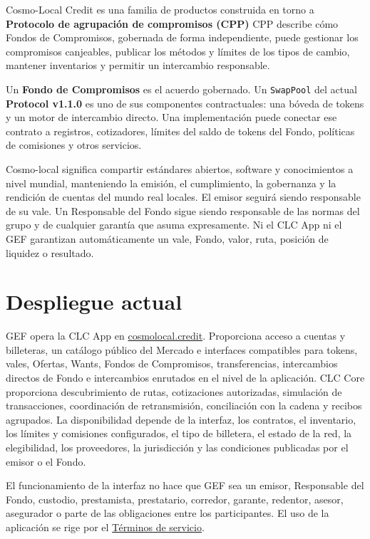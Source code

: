 \documentclass[11pt]{article}
\begin{document}
Cosmo-Local Credit es una familia de productos construida en torno a \textbf{Protocolo de agrupación de compromisos (CPP)} CPP describe cómo Fondos de Compromisos, gobernada de forma independiente, puede gestionar los compromisos canjeables, publicar los métodos y límites de los tipos de cambio, mantener inventarios y permitir un intercambio responsable.

Un \textbf{Fondo de Compromisos} es el acuerdo gobernado. Un \texttt{SwapPool} del actual \textbf{Protocol v1.1.0} es uno de sus componentes contractuales: una bóveda de tokens y un motor de intercambio directo. Una implementación puede conectar ese contrato a registros, cotizadores, límites del saldo de tokens del Fondo, políticas de comisiones y otros servicios.

Cosmo-local significa compartir estándares abiertos, software y conocimientos a nivel mundial, manteniendo la emisión, el cumplimiento, la gobernanza y la rendición de cuentas del mundo real locales. El emisor seguirá siendo responsable de su vale. Un Responsable del Fondo sigue siendo responsable de las normas del grupo y de cualquier garantía que asuma expresamente. Ni el CLC App ni el GEF garantizan automáticamente un vale, Fondo, valor, ruta, posición de liquidez o resultado.

\section*{Despliegue actual}

GEF opera la CLC App en \href{https://cosmolocal.credit}{cosmolocal.credit}. Proporciona acceso a cuentas y billeteras, un catálogo público del Mercado e interfaces compatibles para tokens, vales, Ofertas, Wants, Fondos de Compromisos, transferencias, intercambios directos de Fondo e intercambios enrutados en el nivel de la aplicación. CLC Core proporciona descubrimiento de rutas, cotizaciones autorizadas, simulación de transacciones, coordinación de retransmisión, conciliación con la cadena y recibos agrupados. La disponibilidad depende de la interfaz, los contratos, el inventario, los límites y comisiones configurados, el tipo de billetera, el estado de la red, la elegibilidad, los proveedores, la jurisdicción y las condiciones publicadas por el emisor o el Fondo.

El funcionamiento de la interfaz no hace que GEF sea un emisor, Responsable del Fondo, custodio, prestamista, prestatario, corredor, garante, redentor, asesor, asegurador o parte de las obligaciones entre los participantes. El uso de la aplicación se rige por el \href{https://docs.cosmolocal.credit/es/governance/terms}{Términos de servicio}.
\end{document}
